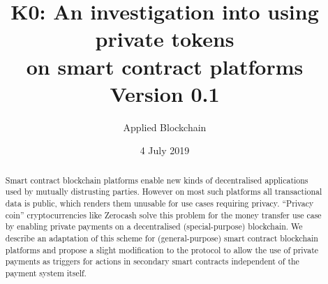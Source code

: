 \documentclass{article}
\title{K0: An investigation into using private tokens\\ on smart contract platforms\\ Version 0.1}
\author{Applied Blockchain}
\date{4 July 2019}
\begin{document}
\maketitle

\begin{abstract}
Smart contract blockchain platforms enable new kinds of decentralised applications used by mutually distrusting parties. However on most such platforms all transactional data is public, which renders them unusable for use cases requiring privacy. ``Privacy coin'' cryptocurrencies like Zerocash solve this problem for the money transfer use case by enabling private payments on a decentralised (special-purpose) blockchain. We describe an adaptation of this scheme for (general-purpose) smart contract blockchain platforms and propose a slight modification to the protocol to allow the use of private payments as triggers for actions in secondary smart contracts independent of the payment system itself.
\end{abstract}
\end{document}
